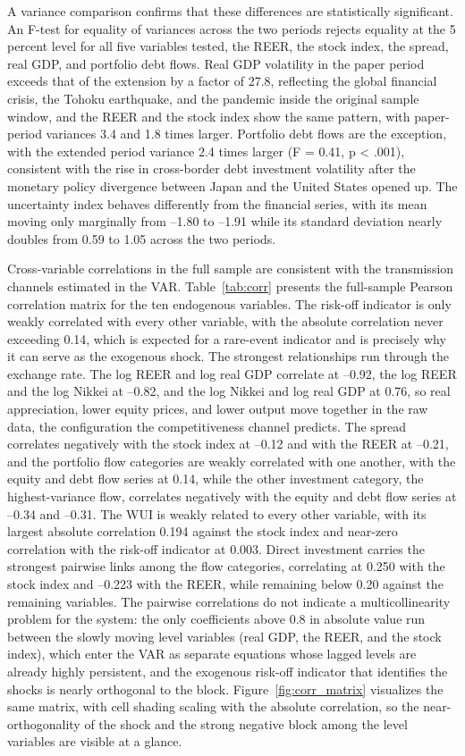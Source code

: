 A variance comparison confirms that these differences are statistically significant. An F-test for equality of variances across the two periods rejects equality at the 5 percent level for all five variables tested, the REER, the stock index, the spread, real GDP, and portfolio debt flows. Real GDP volatility in the paper period exceeds that of the extension by a factor of 27.8, reflecting the global financial crisis, the Tohoku earthquake, and the pandemic inside the original sample window, and the REER and the stock index show the same pattern, with paper-period variances 3.4 and 1.8 times larger. Portfolio debt flows are the exception, with the extended period variance 2.4 times larger (F = 0.41, p < .001), consistent with the rise in cross-border debt investment volatility after the monetary policy divergence between Japan and the United States opened up. The uncertainty index behaves differently from the financial series, with its mean moving only marginally from --1.80 to --1.91 while its standard deviation nearly doubles from 0.59 to 1.05 across the two periods.

Cross-variable correlations in the full sample are consistent with the transmission channels estimated in the VAR. Table~\ref{tab:corr} presents the full-sample Pearson correlation matrix for the ten endogenous variables. The risk-off indicator is only weakly correlated with every other variable, with the absolute correlation never exceeding 0.14, which is expected for a rare-event indicator and is precisely why it can serve as the exogenous shock. The strongest relationships run through the exchange rate. The log REER and log real GDP correlate at --0.92, the log REER and the log Nikkei at --0.82, and the log Nikkei and log real GDP at 0.76, so real appreciation, lower equity prices, and lower output move together in the raw data, the configuration the competitiveness channel predicts. The spread correlates negatively with the stock index at --0.12 and with the REER at --0.21, and the portfolio flow categories are weakly correlated with one another, with the equity and debt flow series at 0.14, while the other investment category, the highest-variance flow, correlates negatively with the equity and debt flow series at --0.34 and --0.31. The WUI is weakly related to every other variable, with its largest absolute correlation 0.194 against the stock index and near-zero correlation with the risk-off indicator at 0.003. Direct investment carries the strongest pairwise links among the flow categories, correlating at 0.250 with the stock index and --0.223 with the REER, while remaining below 0.20 against the remaining variables. The pairwise correlations do not indicate a multicollinearity problem for the system: the only coefficients above 0.8 in absolute value run between the slowly moving level variables (real GDP, the REER, and the stock index), which enter the VAR as separate equations whose lagged levels are already highly persistent, and the exogenous risk-off indicator that identifies the shocks is nearly orthogonal to the block. Figure~\ref{fig:corr_matrix} visualizes the same matrix, with cell shading scaling with the absolute correlation, so the near-orthogonality of the shock and the strong negative block among the level variables are visible at a glance.

